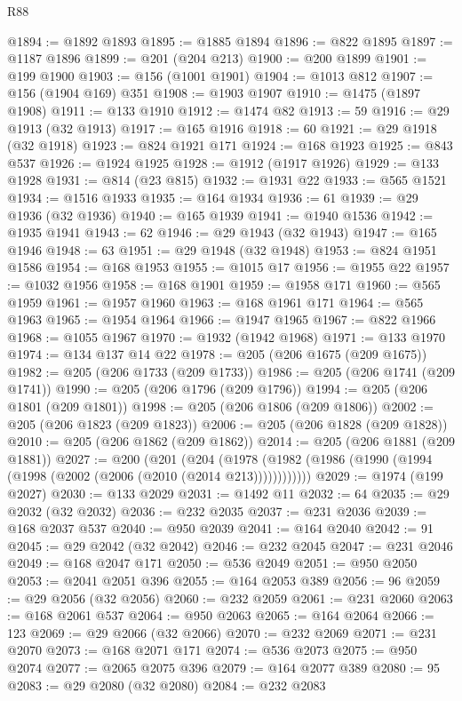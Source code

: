 \begin{lexlean}{R88}
\begin{coremodule}
@1894 := @1892 @1893
@1895 := @1885 @1894
@1896 := @822 @1895
@1897 := @1187 @1896
@1899 := @201 (@204 @213)
@1900 := @200 @1899
@1901 := @199 @1900
@1903 := @156 (@1001 @1901)
@1904 := @1013 @812
@1907 := @156 (@1904 @169) @351
@1908 := @1903 @1907
@1910 := @1475 (@1897 @1908)
@1911 := @133 @1910
@1912 := @1474 @82
@1913 := 59
@1916 := @29 @1913 (@32 @1913)
@1917 := @165 @1916
@1918 := 60
@1921 := @29 @1918 (@32 @1918)
@1923 := @824 @1921 @171
@1924 := @168 @1923
@1925 := @843 @537
@1926 := @1924 @1925
@1928 := @1912 (@1917 @1926)
@1929 := @133 @1928
@1931 := @814 (@23 @815)
@1932 := @1931 @22
@1933 := @565 @1521
@1934 := @1516 @1933
@1935 := @164 @1934
@1936 := 61
@1939 := @29 @1936 (@32 @1936)
@1940 := @165 @1939
@1941 := @1940 @1536
@1942 := @1935 @1941
@1943 := 62
@1946 := @29 @1943 (@32 @1943)
@1947 := @165 @1946
@1948 := 63
@1951 := @29 @1948 (@32 @1948)
@1953 := @824 @1951 @1586
@1954 := @168 @1953
@1955 := @1015 @17
@1956 := @1955 @22
@1957 := @1032 @1956
@1958 := @168 @1901
@1959 := @1958 @171
@1960 := @565 @1959
@1961 := @1957 @1960
@1963 := @168 @1961 @171
@1964 := @565 @1963
@1965 := @1954 @1964
@1966 := @1947 @1965
@1967 := @822 @1966
@1968 := @1055 @1967
@1970 := @1932 (@1942 @1968)
@1971 := @133 @1970
@1974 := @134 @137 @14 @22
@1978 := @205 (@206 @1675 (@209 @1675))
@1982 := @205 (@206 @1733 (@209 @1733))
@1986 := @205 (@206 @1741 (@209 @1741))
@1990 := @205 (@206 @1796 (@209 @1796))
@1994 := @205 (@206 @1801 (@209 @1801))
@1998 := @205 (@206 @1806 (@209 @1806))
@2002 := @205 (@206 @1823 (@209 @1823))
@2006 := @205 (@206 @1828 (@209 @1828))
@2010 := @205 (@206 @1862 (@209 @1862))
@2014 := @205 (@206 @1881 (@209 @1881))
@2027 := @200
    (@201
      (@204 (@1978 (@1982 (@1986 (@1990 (@1994 (@1998 (@2002 (@2006 (@2010 (@2014 @213))))))))))))
@2029 := @1974 (@199 @2027)
@2030 := @133 @2029
@2031 := @1492 @11
@2032 := 64
@2035 := @29 @2032 (@32 @2032)
@2036 := @232 @2035
@2037 := @231 @2036
@2039 := @168 @2037 @537
@2040 := @950 @2039
@2041 := @164 @2040
@2042 := 91
@2045 := @29 @2042 (@32 @2042)
@2046 := @232 @2045
@2047 := @231 @2046
@2049 := @168 @2047 @171
@2050 := @536 @2049
@2051 := @950 @2050
@2053 := @2041 @2051 @396
@2055 := @164 @2053 @389
@2056 := 96
@2059 := @29 @2056 (@32 @2056)
@2060 := @232 @2059
@2061 := @231 @2060
@2063 := @168 @2061 @537
@2064 := @950 @2063
@2065 := @164 @2064
@2066 := 123
@2069 := @29 @2066 (@32 @2066)
@2070 := @232 @2069
@2071 := @231 @2070
@2073 := @168 @2071 @171
@2074 := @536 @2073
@2075 := @950 @2074
@2077 := @2065 @2075 @396
@2079 := @164 @2077 @389
@2080 := 95
@2083 := @29 @2080 (@32 @2080)
@2084 := @232 @2083

\end{coremodule}
\end{lexlean}
